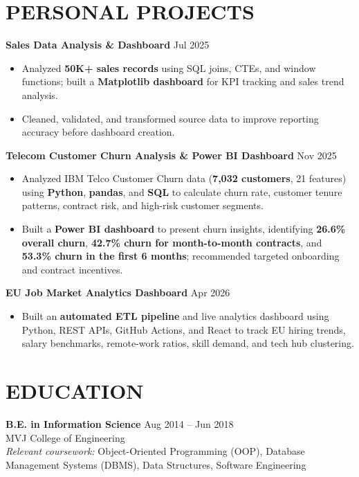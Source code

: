 \documentclass[letterpaper,10pt]{article}
\begin{document}
\section{PERSONAL PROJECTS}
\small
\noindent\textbf{Sales Data Analysis \& Dashboard} \hfill \color{subtext}Jul 2025\color{bodytext}
\begin{itemize}[leftmargin=1.2em, itemsep=1.5pt, parsep=0pt, topsep=2pt]
    \item Analyzed \textbf{50K+ sales records} using SQL joins, CTEs, and window functions; built a \textbf{Matplotlib dashboard} for KPI tracking and sales trend analysis.
    \item Cleaned, validated, and transformed source data to improve reporting accuracy before dashboard creation.
\end{itemize}

\vspace{2pt}
\noindent\textbf{Telecom Customer Churn Analysis \& Power BI Dashboard} \hfill \color{subtext}Nov 2025\color{bodytext}
\begin{itemize}[leftmargin=1.2em, itemsep=1.5pt, parsep=0pt, topsep=2pt]
    \item Analyzed IBM Telco Customer Churn data (\textbf{7,032 customers}, 21 features) using \textbf{Python}, \textbf{pandas}, and \textbf{SQL} to calculate churn rate, customer tenure patterns, contract risk, and high-risk customer segments.
    \item Built a \textbf{Power BI dashboard} to present churn insights, identifying \textbf{26.6\% overall churn}, \textbf{42.7\% churn for month-to-month contracts}, and \textbf{53.3\% churn in the first 6 months}; recommended targeted onboarding and contract incentives.
\end{itemize}

\vspace{2pt}
\noindent\textbf{EU Job Market Analytics Dashboard} \hfill \color{subtext}Apr 2026\color{bodytext}
\begin{itemize}[leftmargin=1.2em, itemsep=1.5pt, parsep=0pt, topsep=2pt]
    \item Built an \textbf{automated ETL pipeline} and live analytics dashboard using Python, REST APIs, GitHub Actions, and React to track EU hiring trends, salary benchmarks, remote-work ratios, skill demand, and tech hub clustering.
\end{itemize}

\section{EDUCATION}
\small
\noindent\textbf{B.E. in Information Science} \hfill \color{subtext}Aug 2014 -- Jun 2018\color{bodytext} \\
MVJ College of Engineering \\
\textit{Relevant coursework:} Object-Oriented Programming (OOP), Database Management Systems (DBMS), Data Structures, Software Engineering
\end{document}
